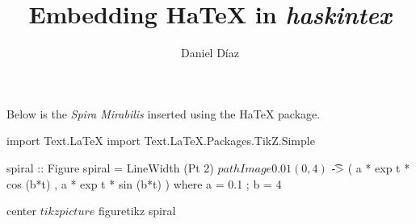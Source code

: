 \documentclass{article}
\author{Daniel Díaz}
\title{Embedding HaTeX in \emph{haskintex}}
\begin{document}
\maketitle
Below is the \emph{Spira Mirabilis} inserted using the HaTeX
package.
\begin{writehaskell}
import Text.LaTeX
import Text.LaTeX.Packages.TikZ.Simple

spiral :: Figure
spiral = LineWidth (Pt 2) $
    pathImage 0.01 (0,4) $
      \t -> ( a * exp t * cos (b*t)
            , a * exp t * sin (b*t)
              )
  where
    a = 0.1 ; b = 4
\end{writehaskell}
\begin{hatex}
center $ tikzpicture $ figuretikz spiral
\end{hatex}
\end{document}
